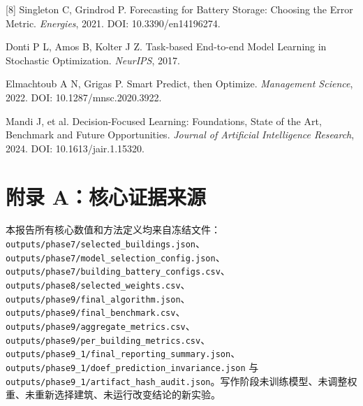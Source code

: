 \documentclass[12pt,a4paper]{article}
\begin{document}
[8] Singleton C, Grindrod P. Forecasting for Battery Storage: Choosing the Error Metric. \textit{Energies}, 2021. DOI: 10.3390/en14196274.\par
[9] Donti P L, Amos B, Kolter J Z. Task-based End-to-end Model Learning in Stochastic Optimization. \textit{NeurIPS}, 2017.\par
[10] Elmachtoub A N, Grigas P. Smart Predict, then Optimize. \textit{Management Science}, 2022. DOI: 10.1287/mnsc.2020.3922.\par
[11] Mandi J, et al. Decision-Focused Learning: Foundations, State of the Art, Benchmark and Future Opportunities. \textit{Journal of Artificial Intelligence Research}, 2024. DOI: 10.1613/jair.1.15320.\par
\normalsize
\section{附录 A：核心证据来源}
本报告所有核心数值和方法定义均来自冻结文件：\nolinkurl{outputs/phase7/selected_buildings.json}、\nolinkurl{outputs/phase7/model_selection_config.json}、\nolinkurl{outputs/phase7/building_battery_configs.csv}、\nolinkurl{outputs/phase8/selected_weights.csv}、\nolinkurl{outputs/phase9/final_algorithm.json}、\nolinkurl{outputs/phase9/final_benchmark.csv}、\nolinkurl{outputs/phase9/aggregate_metrics.csv}、\nolinkurl{outputs/phase9/per_building_metrics.csv}、\nolinkurl{outputs/phase9_1/final_reporting_summary.json}、\nolinkurl{outputs/phase9_1/doef_prediction_invariance.json} 与 \nolinkurl{outputs/phase9_1/artifact_hash_audit.json}。写作阶段未训练模型、未调整权重、未重新选择建筑、未运行改变结论的新实验。\par
\end{document}
